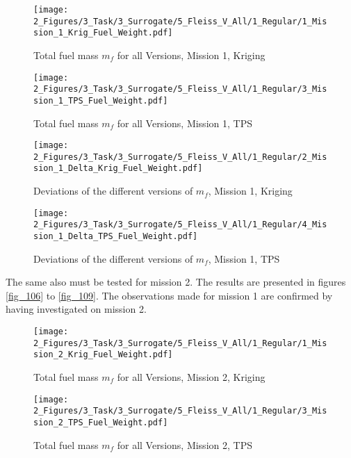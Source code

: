 \begin{figure}[!h]
    \begin{minipage}[h]{0.46\textwidth}
        \centering
        \texttt{[image: 2\_Figures/3\_Task/3\_Surrogate/5\_Fleiss\_V\_All/1\_Regular/1\_Mission\_1\_Krig\_Fuel\_Weight.pdf]}
        \caption{Total fuel mass $m_{f}$ for all Versions, Mission 1, Kriging}
        \label{fig_102}    
    \end{minipage}
    \hfill
    \begin{minipage}{0.46\textwidth}
        \centering
        \texttt{[image: 2\_Figures/3\_Task/3\_Surrogate/5\_Fleiss\_V\_All/1\_Regular/3\_Mission\_1\_TPS\_Fuel\_Weight.pdf]}
        \caption{Total fuel mass $m_{f}$ for all Versions, Mission 1, TPS}
        \label{fig_103}    
    \end{minipage}
\end{figure} 

\begin{figure}[!h]
    \begin{minipage}[h]{0.46\textwidth}
        \centering
        \texttt{[image: 2\_Figures/3\_Task/3\_Surrogate/5\_Fleiss\_V\_All/1\_Regular/2\_Mission\_1\_Delta\_Krig\_Fuel\_Weight.pdf]}
        \caption{ Deviations of the different versions of $m_{f}$, Mission 1, Kriging}
        \label{fig_104}    
    \end{minipage}
    \hfill
    \begin{minipage}{0.46\textwidth}
        \centering
        \texttt{[image: 2\_Figures/3\_Task/3\_Surrogate/5\_Fleiss\_V\_All/1\_Regular/4\_Mission\_1\_Delta\_TPS\_Fuel\_Weight.pdf]}
        \caption{ Deviations of the different versions of $m_{f}$, Mission 1, TPS}
        \label{fig_105}    
    \end{minipage}
\end{figure} 



\FloatBarrier
The same also must be tested for mission 2. The results are 
presented in figures \ref{fig_106} to \ref{fig_109}. 
The observations made for mission 1 are confirmed by having 
investigated on mission 2.

\begin{figure}[!h]
    \begin{minipage}[h]{0.46\textwidth}
        \centering
        \texttt{[image: 2\_Figures/3\_Task/3\_Surrogate/5\_Fleiss\_V\_All/1\_Regular/1\_Mission\_2\_Krig\_Fuel\_Weight.pdf]}
        \caption{Total fuel mass $m_{f}$ for all Versions, Mission 2, Kriging}
        \label{fig_106}    
    \end{minipage}
    \hfill
    \begin{minipage}{0.46\textwidth}
        \centering
        \texttt{[image: 2\_Figures/3\_Task/3\_Surrogate/5\_Fleiss\_V\_All/1\_Regular/3\_Mission\_2\_TPS\_Fuel\_Weight.pdf]}
        \caption{Total fuel mass $m_{f}$ for all Versions, Mission 2, TPS}
        \label{fig_107}    
    \end{minipage}
\end{figure} 

